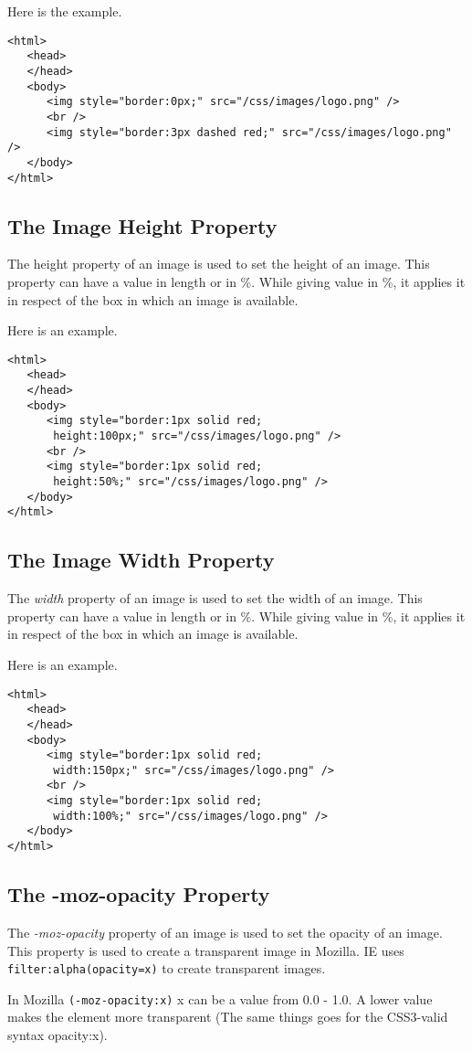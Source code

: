 \documentclass[a4paper,oneside]{book}
\numberwithin{equation}{chapter}
\begin{document}
Here is the example.
\begin{verbatim}
<html>
   <head>
   </head>
   <body>
      <img style="border:0px;" src="/css/images/logo.png" />
      <br />
      <img style="border:3px dashed red;" src="/css/images/logo.png" />
   </body>
</html> 
\end{verbatim}
\subsection{The Image Height Property}
The height property of an image is used to set the height of an image. This property can have a value in length or in \%. While giving value in \%, it applies it in respect of the box in which an image is available.

Here is an example.
\begin{verbatim}
<html>
   <head>
   </head>
   <body>
      <img style="border:1px solid red;
       height:100px;" src="/css/images/logo.png" />
      <br />
      <img style="border:1px solid red;
       height:50%;" src="/css/images/logo.png" />
   </body>
</html> 
\end{verbatim}
\subsection{The Image Width Property}
The \textit{width} property of an image is used to set the width of an image. This property can have a value in length or in \%. While giving value in \%, it applies it in respect of the box in which an image is available.

Here is an example.
\begin{verbatim}
<html>
   <head>
   </head>
   <body>
      <img style="border:1px solid red;
       width:150px;" src="/css/images/logo.png" />
      <br />
      <img style="border:1px solid red;
       width:100%;" src="/css/images/logo.png" />
   </body>
</html> 
\end{verbatim}
\subsection{The -moz-opacity Property}
The \textit{-moz-opacity} property of an image is used to set the opacity of an image. This property is used to create a transparent image in Mozilla. IE uses \verb|filter:alpha(opacity=x)| to create transparent images.

In Mozilla \verb|(-moz-opacity:x)| x can be a value from 0.0 - 1.0. A lower value makes the element more transparent (The same things goes for the CSS3-valid syntax opacity:x).
\end{document}
